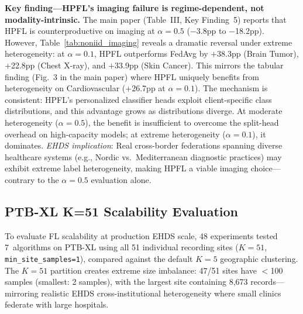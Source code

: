 \documentclass[conference]{IEEEtran}
\begin{document}
\textbf{Key finding---HPFL's imaging failure is regime-dependent, not modality-intrinsic.} The main paper (Table~III, Key Finding~5) reports that HPFL is counterproductive on imaging at $\alpha{=}0.5$ ($-$3.8pp to $-$18.2pp). However, Table~\ref{tab:noniid_imaging} reveals a dramatic reversal under extreme heterogeneity: at $\alpha{=}0.1$, HPFL outperforms FedAvg by $+$38.3pp (Brain Tumor), $+$22.8pp (Chest X-ray), and $+$33.9pp (Skin Cancer). This mirrors the tabular finding (Fig.~3 in the main paper) where HPFL uniquely benefits from heterogeneity on Cardiovascular ($+$26.7pp at $\alpha{=}0.1$). The mechanism is consistent: HPFL's personalized classifier heads exploit client-specific class distributions, and this advantage grows as distributions diverge. At moderate heterogeneity ($\alpha{=}0.5$), the benefit is insufficient to overcome the split-head overhead on high-capacity models; at extreme heterogeneity ($\alpha{=}0.1$), it dominates. \textit{EHDS implication}: Real cross-border federations spanning diverse healthcare systems (e.g., Nordic vs.\ Mediterranean diagnostic practices) may exhibit extreme label heterogeneity, making HPFL a viable imaging choice---contrary to the $\alpha{=}0.5$ evaluation alone.


\subsection{PTB-XL K=51 Scalability Evaluation}
\label{sec:k52_scalability}

To evaluate FL scalability at production EHDS scale, 48 experiments tested 7~algorithms on PTB-XL using all 51 individual recording sites ($K{=}51$, \texttt{min\_site\_samples=1}), compared against the default $K{=}5$ geographic clustering. The $K{=}51$ partition creates extreme size imbalance: 47/51 sites have $<$100 samples (smallest: 2 samples), with the largest site containing 8,673 records---mirroring realistic EHDS cross-institutional heterogeneity where small clinics federate with large hospitals.
\end{document}
